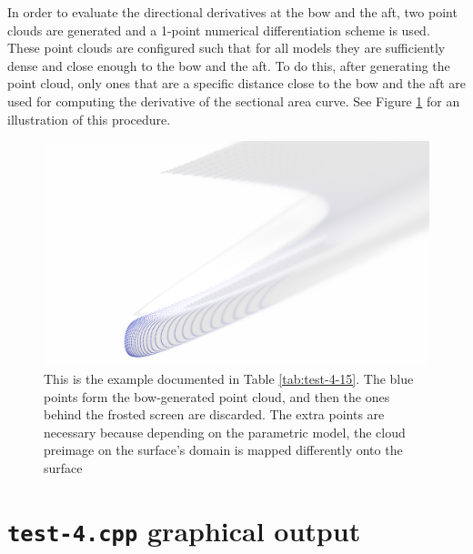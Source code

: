\documentclass{report}
\begin{document}
\newpar In order to evaluate the directional derivatives at the bow and the aft, two
point clouds are generated and a 1-point numerical differentiation scheme is used.
These point clouds are configured such that for all models they are sufficiently dense and 
close enough to the bow and the aft. To do this, after generating the point cloud, only ones 
that are a specific distance close to the bow and the aft are used for computing the derivative of 
the sectional area curve. See Figure \ref{fig:test-4-experiment-15-render} for an illustration of 
this procedure.

\begin{figure}[H]
    \centering
    \includegraphics[width=\linewidth]{figures/test-4-experiment-15-render.png}
    \caption{This is the example documented in Table \ref{tab:test-4-15}. The blue points form the 
    bow-generated point cloud, and then the ones behind the frosted screen are discarded. The extra points 
    are necessary because depending on the parametric model, the cloud preimage on the surface's domain is 
    mapped differently onto the surface}
    \label{fig:test-4-experiment-15-render}
\end{figure}

\printbibliography

\appendix

\chapter{\texttt{test-4.cpp}  graphical output}\label{appendix:test-4-graphics}
\end{document}
